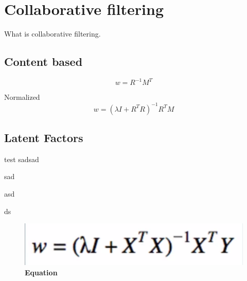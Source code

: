 \section{Collaborative filtering}
What is collaborative filtering.
\cite{RecommenderSystems:2}
\subsection{Content based}
\begin{equation}
 w=R^{-1}M^{T}
\end{equation}

Normalized \\
\begin{equation}
 w=(\lambda I + R^{T}R)^{-1} R^{T}M 
\end{equation}

\subsection{Latent Factors}
test
sadsad

sad

asd

ds
\begin{figure}[ht]
\centering
\includegraphics[width=0.7\linewidth]{images/equation01}
\caption{\bfseries Equation}
\label{fig:equation02}
\end{figure}